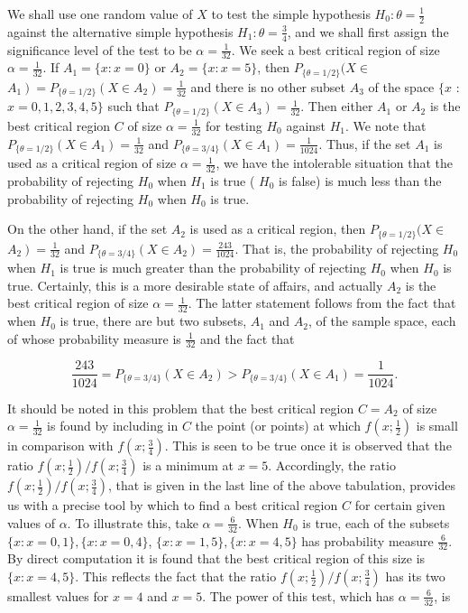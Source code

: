 We shall use one random value of $X$ to test the simple hypothesis $H_{0}: \theta=\frac{1}{2}$ against the alternative simple hypothesis $H_{1}: \theta=\frac{3}{4}$, and we shall first assign the significance level of the test to be $\alpha=\frac{1}{32}$. We seek a best critical region of size $\alpha=\frac{1}{32}$. If $A_{1}=\{x: x=0\}$ or $A_{2}=\{x: x=5\}$, then $P_{\{\theta=1 / 2\}}(X \in$ $\left.A_{1}\right)=P_{\{\theta=1 / 2\}}\left(X \in A_{2}\right)=\frac{1}{32}$ and there is no other subset $A_{3}$ of the space $\{x$ : $x=0,1,2,3,4,5\}$ such that $P_{\{\theta=1 / 2\}}\left(X \in A_{3}\right)=\frac{1}{32}$. Then either $A_{1}$ or $A_{2}$ is the best critical region $C$ of size $\alpha=\frac{1}{32}$ for testing $H_{0}$ against $H_{1}$. We note that $P_{\{\theta=1 / 2\}}\left(X \in A_{1}\right)=\frac{1}{32}$ and $P_{\{\theta=3 / 4\}}\left(X \in A_{1}\right)=\frac{1}{1024}$. Thus, if the set $A_{1}$ is used as a critical region of size $\alpha=\frac{1}{32}$, we have the intolerable situation that the probability of rejecting $H_{0}$ when $H_{1}$ is true ( $H_{0}$ is false) is much less than the probability of rejecting $H_{0}$ when $H_{0}$ is true.

On the other hand, if the set $A_{2}$ is used as a critical region, then $P_{\{\theta=1 / 2\}}(X \in$ $\left.A_{2}\right)=\frac{1}{32}$ and $P_{\{\theta=3 / 4\}}\left(X \in A_{2}\right)=\frac{243}{1024}$. That is, the probability of rejecting $H_{0}$ when $H_{1}$ is true is much greater than the probability of rejecting $H_{0}$ when $H_{0}$ is true. Certainly, this is a more desirable state of affairs, and actually $A_{2}$ is the best critical region of size $\alpha=\frac{1}{32}$. The latter statement follows from the fact that when $H_{0}$ is true, there are but two subsets, $A_{1}$ and $A_{2}$, of the sample space, each of whose probability measure is $\frac{1}{32}$ and the fact that

$$
\frac{243}{1024}=P_{\{\theta=3 / 4\}}\left(X \in A_{2}\right)>P_{\{\theta=3 / 4\}}\left(X \in A_{1}\right)=\frac{1}{1024} .
$$

It should be noted in this problem that the best critical region $C=A_{2}$ of size $\alpha=\frac{1}{32}$ is found by including in $C$ the point (or points) at which $f\left(x ; \frac{1}{2}\right)$ is small in comparison with $f\left(x ; \frac{3}{4}\right)$. This is seen to be true once it is observed that the ratio $f\left(x ; \frac{1}{2}\right) / f\left(x ; \frac{3}{4}\right)$ is a minimum at $x=5$. Accordingly, the ratio $f\left(x ; \frac{1}{2}\right) / f\left(x ; \frac{3}{4}\right)$, that is given in the last line of the above tabulation, provides us with a precise tool by which to find a best critical region $C$ for certain given values of $\alpha$. To illustrate this, take $\alpha=\frac{6}{32}$. When $H_{0}$ is true, each of the subsets $\{x: x=0,1\},\{x: x=0,4\}$, $\{x: x=1,5\},\{x: x=4,5\}$ has probability measure $\frac{6}{32}$. By direct computation it is found that the best critical region of this size is $\{x: x=4,5\}$. This reflects the fact that the ratio $f\left(x ; \frac{1}{2}\right) / f\left(x ; \frac{3}{4}\right)$ has its two smallest values for $x=4$ and $x=5$. The power of this test, which has $\alpha=\frac{6}{32}$, is

